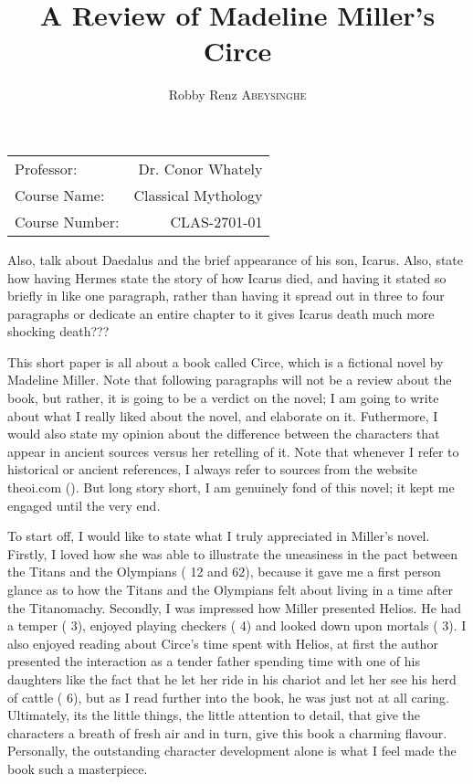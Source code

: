 \documentclass[12pt, a4paper]{article}
\author{Robby Renz \textsc{Abeysinghe}}
\title{A Review of Madeline Miller's Circe}
\begin{document}
\maketitle
\begin{center}
\begin{tabular}{l r}
Professor: & Dr. Conor Whately \\
Course Name: & Classical Mythology \\
Course Number: & CLAS-2701-01
\end{tabular}
\end{center}
\newpage

Also, talk about Daedalus and the brief appearance of his son, Icarus.
Also, state how having Hermes state the story of how Icarus died, and having it stated so briefly in like one paragraph, rather than having it spread out in three to four paragraphs or dedicate an entire chapter to it gives Icarus death much more shocking death???

This short paper is all about a book called Circe, which is a fictional novel by Madeline Miller. Note that following paragraphs will not be a review about the book, but rather, it is going to be a verdict on the novel; I am going to write about what I really liked about the novel, and elaborate on it. Futhermore, I would also state my opinion about the difference between the characters that appear in ancient sources versus her retelling of it. Note that whenever I refer to historical or ancient references, I always refer to sources from the website theoi.com (\cite{theoi}). But long story short, I am genuinely fond of this novel; it kept me engaged until the very end. 

To start off, I would like to state what I truly appreciated in Miller's novel. Firstly, I loved how she was able to illustrate the uneasiness in the pact between the Titans and the Olympians (\cite{miller_circe_2018} 12 and 62), because it gave me a first person glance as to how the Titans and the Olympians felt about living in a time after the Titanomachy. Secondly, I was impressed how Miller presented Helios. He had a temper (\cite{miller_circe_2018} 3), enjoyed playing checkers (\cite{miller_circe_2018} 4) and looked down upon mortals (\cite{miller_circe_2018} 3). I also enjoyed reading about Circe's time spent with Helios, at first the author presented the interaction as a tender father spending time with one of his daughters like the fact that he let her ride in his chariot and let her see his herd of cattle (\cite{miller_circe_2018} 6), but as I read further into the book, he was just not at all caring. Ultimately, its the little things, the little attention to detail, that give the characters a breath of fresh air and in turn, give this book a charming flavour. Personally, the outstanding character development alone is what I feel made the book such a masterpiece.
\end{document}
